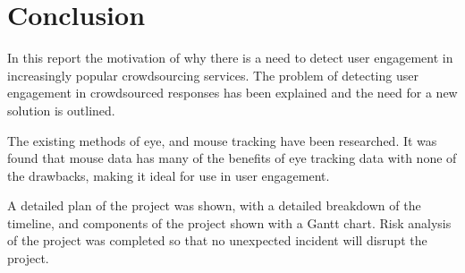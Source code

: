 \documentclass{article}
\begin{document}
\section{Conclusion}





In this report the motivation of why there is a need to detect user engagement in increasingly popular crowdsourcing services.
The problem of detecting user engagement in crowdsourced responses has been explained and the need for a new solution is outlined.

The existing methods of eye, and mouse tracking have been researched.
It was found that mouse data has many of the benefits of eye tracking data with none of the drawbacks, making it ideal for use in user engagement.

A detailed plan of the project was shown, with a detailed breakdown of the timeline, and components of the project shown with a Gantt chart.
Risk analysis of the project was completed so that no unexpected incident will disrupt the project.

\printbibliography
\end{document}
